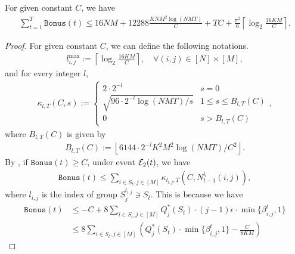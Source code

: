 \begin{lemma}\label{lemma:bonus-t-bound}
For given constant $C$, we have
\begin{align*}
    \sum_{t=1}^T \texttt{Bonus}(t) \le 16NM + 12288\frac{KNM^2\log(NMT)}{C} + TC + \frac{\pi^2}{6} \left\lceil \log_2\frac{16KM}{C} \right\rceil.
\end{align*}
\begin{proof}
For given constant $C$, we can define the following notations.
\begin{align}\label{eq:def-lmax}
    l_{i,j}^{\max} := \left\lceil \log_2 \frac{16KM}{C} \right\rceil, \quad \forall (i, j) \in [N] \times [M],
\end{align}
and for every integer $l$,
\begin{equation}\label{eq:def-kappa}
\begin{aligned}
    \kappa_{l,T}(C,s) := \begin{cases}
        2\cdot 2^{-l} & s =0 \\
        \sqrt{{96 \cdot 2^{-l} \log(NMT)}/s} & 1 \le s \le B_{l,T}(C) \\
        0 & s > B_{l,T}(C)
    \end{cases},
\end{aligned}
\end{equation}
where $B_{l,T}(C)$ is given by
\begin{align}\label{eq:def-BlT}
    B_{l,T}(C) := \left\lfloor{6144 \cdot 2^{-l}K^2M^2\log(NMT)}/{C^2}\right\rfloor.
\end{align}
By \citet[Lemma 5]{wang2017improving}, if $\texttt{Bonus}(t) \ge C$, under event ${\mathcal{E}}_2(t)$, we have
\begin{align*}
    \texttt{Bonus}(t) \le \sum_{i \in S_t, j \in [M]} \kappa_{l_{i,j}, T}(C, N_{t-1}^{l_i}(i,j)),
\end{align*}
where $l_{i,j}$ is the index of group $S_j^{l_{i,j}} \ni S_t$. This is because we have
\begin{align*}
    \texttt{Bonus}(t) &\le -C + 8 \sum_{i \in S_t, j \in [M]} Q_j^*(S_t) \cdot (j - 1)\epsilon \cdot \min\{\beta_{i,j}^t, 1\} \\
    &\le 8 \sum_{i \in S_t, j \in [M]} \left(Q_j^*(S_t) \cdot \min\{\beta_{i,j}^t, 1\} - \frac{C}{8KM}\right)
\end{align*}


\end{proof}
\end{lemma}
